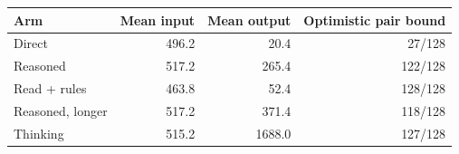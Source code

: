 \begin{tabular}{lrrr}
\toprule
Arm & Mean input & Mean output & Optimistic pair bound \\
\midrule
Direct & 496.2 & 20.4 & 27/128 \\
Reasoned & 517.2 & 265.4 & 122/128 \\
Read + rules & 463.8 & 52.4 & 128/128 \\
Reasoned, longer & 517.2 & 371.4 & 118/128 \\
Thinking & 515.2 & 1688.0 & 127/128 \\
\bottomrule
\end{tabular}
